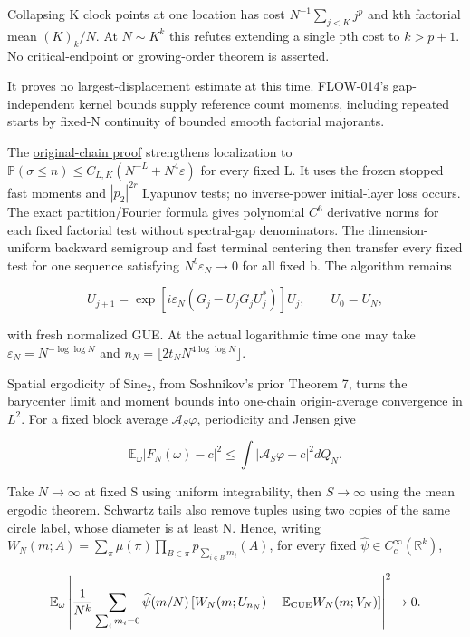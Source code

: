 Collapsing K clock points at one location has cost
\(N^{-1}\sum_{j<K}j^p\) and kth factorial mean \((K)_k/N\). At \(N\sim K^k\)
this refutes extending a single pth cost to \(k>p+1\). No critical-endpoint
or growing-order theorem is asserted.

It proves no largest-displacement estimate at this time. FLOW-014's
gap-independent kernel bounds supply reference count moments, including
repeated starts by fixed-N continuity of bounded smooth factorial majorants.

\begin{theorem}\label{pass2:frontier-flow-017}

The \href{https://github.com/ChurilovMaksim/BGS/blob/main/mathematics/coboundary_all_order_limit.md}{original-chain proof} strengthens
localization to \(\mathbb P(\sigma\le n)\le C_{L,K}(N^{-L}+N^4\varepsilon)\)
for every fixed L. It uses the frozen stopped fast moments and
\(|p_2|^{2r}\) Lyapunov tests; no inverse-power initial-layer loss occurs.
The exact partition/Fourier formula gives polynomial \(C^6\) derivative
norms for each fixed factorial test without spectral-gap denominators.
The dimension-uniform backward semigroup and fast terminal centering then
transfer every fixed test for one sequence satisfying
\(N^b\varepsilon_N\to0\) for all fixed b. The algorithm remains

\[
U_{j+1}=\exp[i\varepsilon_N(G_j-U_jG_jU_j^*)]U_j,
\qquad U_0=U_N,
\]

with fresh normalized GUE. At the actual logarithmic time one may take
\(\varepsilon_N=N^{-\log\log N}\) and
\(n_N=\lfloor2t_NN^{4\log\log N}\rfloor\).

Spatial ergodicity of Sine\(_2\), from Soshnikov's prior Theorem 7, turns
the barycenter limit and moment bounds into one-chain origin-average
convergence in \(L^2\). For a fixed block average \(\mathcal A_S\varphi\),
periodicity and Jensen give

\[
\mathbb E_\omega|F_N(\omega)-c|^2
\le\int|\mathcal A_S\varphi-c|^2dQ_N.
\]

Take \(N\to\infty\) at fixed S using uniform integrability, then
\(S\to\infty\) using the mean ergodic theorem. Schwartz tails also remove
tuples using two copies of the same circle label, whose diameter is at
least N. Hence, writing
\(W_N(m;A)=\sum_\pi\mu(\pi)\prod_{B\in\pi}p_{\sum_{i\in B}m_i}(A)\),
for every fixed \(\widehat\psi\in C_c^\infty(\mathbb R^k)\),

\[
\mathbb E_\omega\left|
\frac1{N^k}\sum_{\sum_i m_i=0}\widehat\psi(m/N)
\left[W_N(m;U_{n_N})-\mathbb E_{\rm CUE}W_N(m;V_N)\right]
\right|^2\to0.
\]


\end{theorem}
